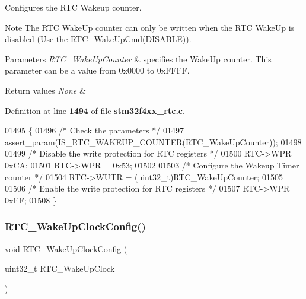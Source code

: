 Configures the R\+TC Wakeup counter. 

\begin{DoxyNote}{Note}
The R\+TC Wake\+Up counter can only be written when the R\+TC Wake\+Up is disabled (Use the R\+T\+C\+\_\+\+Wake\+Up\+Cmd(\+D\+I\+S\+A\+B\+L\+E)). 
\end{DoxyNote}

\begin{DoxyParams}{Parameters}
{\em R\+T\+C\+\_\+\+Wake\+Up\+Counter} & specifies the Wake\+Up counter. This parameter can be a value from 0x0000 to 0x\+F\+F\+FF. \\
\hline
\end{DoxyParams}

\begin{DoxyRetVals}{Return values}
{\em None} & \\
\hline
\end{DoxyRetVals}


Definition at line \textbf{ 1494} of file \textbf{ stm32f4xx\+\_\+rtc.\+c}.


\begin{DoxyCode}
01495 \{
01496   \textcolor{comment}{/* Check the parameters */}
01497   assert_param(IS_RTC_WAKEUP_COUNTER(RTC\_WakeUpCounter));
01498   
01499   \textcolor{comment}{/* Disable the write protection for RTC registers */}
01500   RTC->WPR = 0xCA;
01501   RTC->WPR = 0x53;
01502   
01503   \textcolor{comment}{/* Configure the Wakeup Timer counter */}
01504   RTC->WUTR = (uint32\_t)RTC\_WakeUpCounter;
01505   
01506   \textcolor{comment}{/* Enable the write protection for RTC registers */}
01507   RTC->WPR = 0xFF; 
01508 \}
\end{DoxyCode}
\mbox{\label{group__RTC__Group4_ga2557b02b318211112731a91a190c4b26}} 
\subsubsection{R\+T\+C\+\_\+\+Wake\+Up\+Clock\+Config()}
{\footnotesize\ttfamily void R\+T\+C\+\_\+\+Wake\+Up\+Clock\+Config (\begin{DoxyParamCaption}\item[{uint32\+\_\+t}]{R\+T\+C\+\_\+\+Wake\+Up\+Clock }\end{DoxyParamCaption})}



